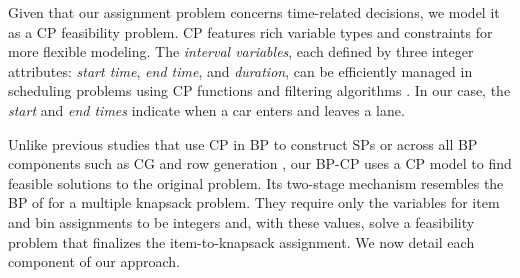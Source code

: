 \documentclass[12pt]{article}
\begin{document}
Given that our assignment problem concerns time-related decisions, we model it as a CP feasibility problem. CP features rich variable types and constraints for more flexible modeling. The \textit{interval variables}, each defined by three integer attributes: \textit{start time}, \textit{end time}, and \textit{duration}, can be efficiently managed in scheduling problems using CP functions and filtering algorithms \citep{kasapidis2025unified}. In our case, the \textit{start} and \textit{end times} indicate when a car enters and leaves a lane.



Unlike previous studies that use CP in BP to construct SPs \citep{hashemi2016constraint} or across all BP components such as CG and row generation \citep{zhang2024computing}, our BP-CP uses a CP model to find feasible solutions to the original problem. Its two-stage mechanism resembles the BP of \citet{lalonde2022branch} for a multiple knapsack problem. They require only the variables for item and bin assignments to be integers and, with these values, solve a feasibility problem that finalizes the item-to-knapsack assignment. We now detail each component of our approach.
\end{document}
